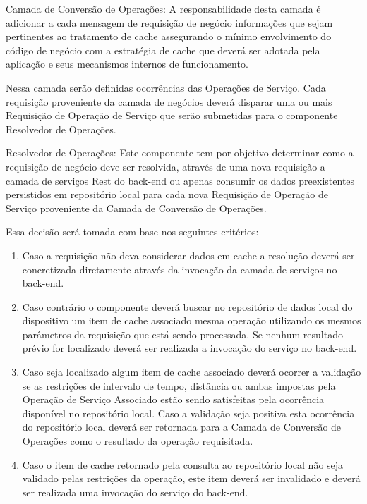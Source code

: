 \documentclass[
	article,			%
	11pt,				%
	oneside,			%
	a4paper,			%
	english,			%
	brazil,				%
	sumario=tradicional
]{abntex2}
\begin{document}
 \begin{description}
 	\item Camada de Conversão de Operações:
 	A responsabilidade desta camada é adicionar a cada mensagem de requisição de negócio informações que sejam pertinentes ao tratamento de cache assegurando o mínimo envolvimento do código de negócio com a estratégia de cache que deverá ser adotada pela aplicação e seus mecanismos internos de funcionamento.
 	
 	Nessa camada serão definidas ocorrências das Operações de Serviço.
 	Cada requisição proveniente da camada de negócios deverá disparar uma ou mais Requisição de Operação de Serviço que serão submetidas para o componente Resolvedor de Operações.
 	
 	\item Resolvedor de Operações:
 	Este componente tem por objetivo determinar como a requisição de negócio deve ser resolvida, através de uma nova requisição a camada de serviços Rest do \gls{back-end} ou apenas consumir os dados preexistentes persistidos em repositório local para cada nova Requisição de Operação de Serviço proveniente da Camada de Conversão de Operações.
 	
 	Essa decisão será tomada com base nos seguintes critérios:
 	\begin{enumerate}
 		\item Caso a requisição não deva considerar dados em cache a resolução deverá ser concretizada diretamente através da invocação da camada de serviços no \gls{back-end}.
 		\item Caso contrário o componente deverá buscar no repositório de dados local do dispositivo um item de cache associado mesma operação utilizando os mesmos parâmetros da requisição que está sendo processada. Se nenhum resultado prévio for localizado deverá ser realizada a invocação do serviço no \gls{back-end}.
 		\item Caso seja localizado algum item de cache associado deverá ocorrer a validação se as restrições de intervalo de tempo, distância ou ambas impostas pela Operação de Serviço Associado estão sendo satisfeitas pela ocorrência disponível no repositório local.
 		Caso a validação seja positiva esta ocorrência do repositório local deverá ser retornada para a Camada de Conversão de Operações como o resultado da operação requisitada.
 		\item Caso o item de cache retornado pela consulta ao repositório local não seja validado pelas restrições da operação, este item deverá ser invalidado e deverá ser realizada uma invocação do serviço do \gls{back-end}.
 	\end{enumerate}
 	

\end{description}
\end{document}
